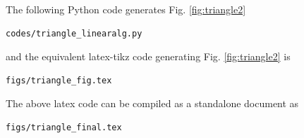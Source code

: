 \begin{enumerate}[label=\thesection.\arabic*.,ref=\thesection.\theenumi]
\solution The  following Python code generates Fig. \ref{fig:triangle2}

\begin{lstlisting}
codes/triangle_linearalg.py
\end{lstlisting}

and the equivalent latex-tikz code generating Fig. \ref{fig:triangle2} is 
\begin{lstlisting}
figs/triangle_fig.tex
\end{lstlisting}
%
The above latex code can be compiled as a standalone document as
\begin{lstlisting}
figs/triangle_final.tex
\end{lstlisting}
\end{enumerate}

